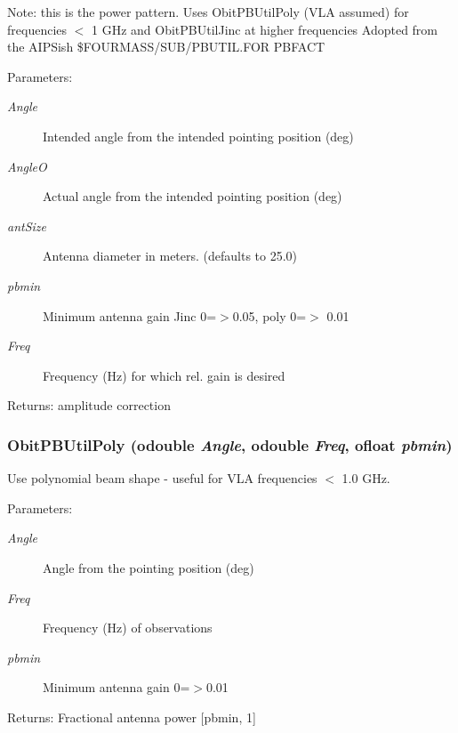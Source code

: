 Note: this is the power pattern. Uses Obit\-PBUtil\-Poly (VLA assumed) for frequencies $<$ 1 GHz and Obit\-PBUtil\-Jinc at higher frequencies Adopted from the AIPSish \$FOURMASS/SUB/PBUTIL.FOR PBFACT \begin{Desc}
\item[Parameters:]
\begin{description}
\item[{\em Angle}]Intended angle from the intended pointing position (deg) \item[{\em Angle\-O}]Actual angle from the intended pointing position (deg) \item[{\em ant\-Size}]Antenna diameter in meters. (defaults to 25.0) \item[{\em pbmin}]Minimum antenna gain Jinc 0=$>$0.05, poly 0=$>$ 0.01 \item[{\em Freq}]Frequency (Hz) for which rel. gain is desired \end{description}
\end{Desc}
\begin{Desc}
\item[Returns:]amplitude correction \end{Desc}
\subsubsection{ Obit\-PBUtil\-Poly ({\bf odouble} {\em Angle}, {\bf odouble} {\em Freq}, {\bf ofloat} {\em pbmin})}\label{ObitPBUtil_8c_a0}


Use polynomial beam shape - useful for VLA frequencies $<$ 1.0 GHz. 

\begin{Desc}
\item[Parameters:]
\begin{description}
\item[{\em Angle}]Angle from the pointing position (deg) \item[{\em Freq}]Frequency (Hz) of observations \item[{\em pbmin}]Minimum antenna gain 0=$>$0.01 \end{description}
\end{Desc}
\begin{Desc}
\item[Returns:]Fractional antenna power [pbmin, 1] \end{Desc}
